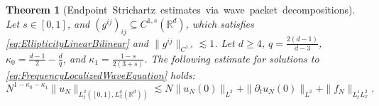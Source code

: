 \documentclass{amsart}
\newtheorem{theorem}{Theorem}[section]
\theoremstyle{definition}
\newcommand{\R}{\mathbb{R}}
\begin{document}
\begin{theorem}[Endpoint~Strichartz~estimates~via~wave~packet~decompositions]
\label{thm:EndpointStrichartzWave}
Let $s \in [0,1]$, and $(g^{ij})_{ij} \subseteq C^{1,s}(\R^{d}) $, which satisfies \eqref{eq:EllipticityLinearBilinear} and $\| g^{ij} \|_{C^{1,s}} \lesssim 1$.
Let $d \geq 4$, $q = \frac{2(d-1)}{d-3}$, $\kappa_0 = \frac{d-1}{2} - \frac{d}{q}$, and $\kappa_1 = \frac{1-s}{2(3+s)}$. The following estimate for solutions to \eqref{eq:FrequencyLocalizedWaveEquation} holds:
\begin{equation}
\label{eq:EndpointStrichartzWave}
N^{1-\kappa_0 - \kappa_1} \| u_N \|_{L_t^2([0,1],L^q_x(\R^d))} \lesssim N \| u_N(0) \|_{L^2} + \| \partial_t u_N(0) \|_{L^2} + \| f_N \|_{L^1_t L^2_x}.
\end{equation}
\end{theorem}
\end{document}
